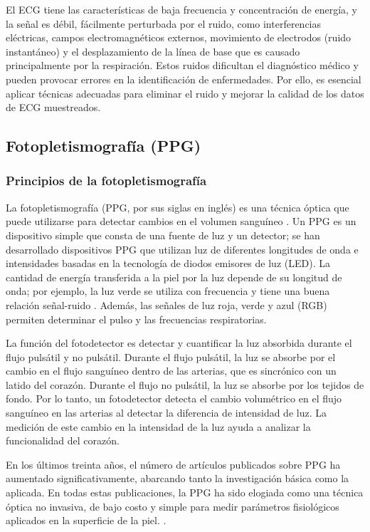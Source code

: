     El ECG tiene las características de baja frecuencia y concentración de energía, y la señal es débil, fácilmente perturbada por el ruido, como interferencias eléctricas, campos electromagnéticos externos, movimiento de electrodos (ruido instantáneo)  y el desplazamiento de la línea de base que es causado principalmente por la respiración. Estos ruidos dificultan el diagnóstico médico y pueden provocar errores en la identificación de enfermedades. Por ello, es esencial aplicar técnicas adecuadas para eliminar el ruido y mejorar la calidad de los datos de ECG muestreados. \cite{AlMahamdy_2014}

    \subsection{Fotopletismografía (PPG)}
        \subsubsection{Principios de la fotopletismografía}
            La fotopletismografía (PPG, por sus siglas en inglés) es una técnica óptica que puede utilizarse para detectar cambios en el volumen sanguíneo \cite{Hertzman_1938}. Un PPG es un dispositivo simple que consta de una fuente de luz y un detector; se han desarrollado dispositivos PPG que utilizan luz de diferentes longitudes de onda e intensidades basadas en la tecnología de diodos emisores de luz (LED). La cantidad de energía transferida a la piel por la luz depende de su longitud de onda; por ejemplo, la luz verde se utiliza con frecuencia y tiene una buena relación señal-ruido \cite{Challoner_1979}. Además, las señales de luz roja, verde y azul (RGB) permiten determinar el pulso y las frecuencias respiratorias.

            La función del fotodetector es detectar y cuantificar la luz absorbida durante el flujo pulsátil y no pulsátil. Durante el flujo pulsátil, la luz se absorbe por el cambio en el flujo sanguíneo dentro de las arterias, que es sincrónico con un latido del corazón. Durante el flujo no pulsátil, la luz se absorbe por los tejidos de fondo. Por lo tanto, un fotodetector detecta el cambio volumétrico en el flujo sanguíneo en las arterias al detectar la diferencia de intensidad de luz. La medición de este cambio en la intensidad de la luz ayuda a analizar la funcionalidad del corazón.

            En los últimos treinta años, el número de artículos publicados sobre PPG ha aumentado significativamente, abarcando tanto la investigación básica como la aplicada. En todas estas publicaciones, la PPG ha sido elogiada como una técnica óptica no invasiva, de bajo costo y simple para medir parámetros fisiológicos aplicados en la superficie de la piel. \cite{PPG}.

